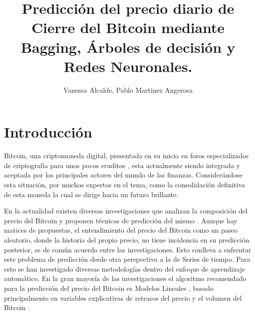 \documentclass[a4paper,12pt,twocolumn]{article}
\date{ }
\title{\textbf{Predicción del precio diario de Cierre del Bitcoin mediante Bagging, Árboles de decisión y Redes Neuronales. }}
\author{Vanessa Alcalde, Pablo Martinez Angerosa}
\begin{document}
\setlength{\columnsep}{0.8cm}

\vspace{1.0cm}


\section{Introducción}
Bitcoin, una criptomoneda digital, presentada en su inicio en foros especializados de criptografía para unos pocos eruditos \cite{Satoshi}, esta actualmente siendo integrada y aceptada por los principales actores del mundo de las finanzas. Considerándose esta situación, por muchos expertos en el tema, como la consolidación definitiva de esta moneda la cual se dirige hacia un futuro brillante. 

En la actualidad existen diversas investigaciones que analizan la composición del precio del Bitcoin y proponen técnicas de predicción del mismo \cite{mainDriversBitcoin}. Aunque hay matices de propuestas, el entendimiento del precio del Bitcoin como un paseo aleatorio, donde la historia del propio precio, no tiene incidencia en su predicción posterior, es de común acuerdo entre las investigaciones. Esto conlleva a enfrentar este problema de predicción desde otra perspectiva a la de Series de tiempo. Para esto se han investigado diversas metodologías dentro del enfoque de aprendizaje automático. En la gran mayoría de las investigaciones el algoritmo recomendado para la predicción del precio del Bitcoin es Modelos Lineales  \cite{regression_for_bitcoin_price}, basado principalmente en variables explicativas de retrasos del precio y el volumen del Bitcoin  \cite{forecastinBitcoinClosing}.  
\end{document}
